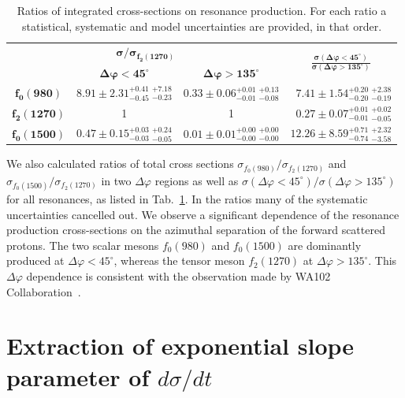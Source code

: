 {
\renewcommand{\arraystretch}{1.5}
\begin{table}[]\centering
\begin{tabular}{c|c|c|c}%
	\multicolumn{3}{c}{\;\;\;\;\;\;\;\;\;\;\;\;\;\;\;\;\;\;\;$\bm{\displaystyle\sigma/\sigma_{f_{2}(1270)}}$} & \multirow{2}{*}{$\bm{\displaystyle\frac{\sigma(\Delta\varphi<45^{\circ})}{\sigma(\Delta\varphi>135^{\circ})}}$} \\
	~ & $\bm{\Delta\varphi<45^{\circ}}$ & $\bm{\Delta\varphi>135^{\circ}}$ & \\
	\hline\hline $\bm{f_{0}(980)}$ & $8.91 \pm 2.31 ^{+0.41}_{-0.45} ~^{+7.18}_{-0.23}$ & $0.33 \pm 0.06 ^{+0.01}_{-0.01} ~^{+0.13}_{-0.08}$ & ~$7.41 \pm 1.54 ^{+0.20}_{-0.20} ~^{+2.38}_{-0.19}$\\ %
	$\bm{f_{2}(1270)}$ & 1 & 1 & ~$0.27 \pm 0.07 ^{+0.01}_{-0.01} ~^{+0.02}_{-0.05}$\\%
	$\bm{f_{0}(1500)}$ & $0.47 \pm 0.15 ^{+0.03}_{-0.03} ~^{+0.24}_{-0.05}$ & $0.01 \pm 0.01 ^{+0.00}_{-0.00} ~^{+0.00}_{-0.00}$ & $12.26 \pm 8.59 ^{+0.71}_{-0.74} ~^{+2.32}_{-3.58}$\\ %
\end{tabular}
\caption{Ratios of integrated cross-sections on resonance production. For each ratio a statistical, systematic and model uncertainties are provided, in that order.}\label{tab:resonanceRatio}
\end{table}
}
%
\indent
We also calculated ratios of total cross sections $\sigma_{f_0(980)}/\sigma_{f_2(1270)}$ and $\sigma_{f_0(1500)}/\sigma_{f_2(1270)}$ in two $\Delta \varphi$ regions as well as $\sigma(\Delta \varphi<45^{\circ})/\sigma(\Delta \varphi>135^{\circ})$ for 
all resonances, as listed in Tab.~\ref{tab:resonanceRatio}. In the ratios many of the systematic uncertainties cancelled out.
We observe a significant dependence of the resonance production cross-sections on the azimuthal separation of the forward scattered protons. The two scalar mesons $f_{0}(980)$ and $f_{0}(1500)$ are dominantly produced at $\Delta\varphi<45^{\circ}$, whereas the tensor meson $f_{2}(1270)$ at $\Delta\varphi>135^{\circ}$. This $\Delta\varphi$ dependence is consistent with the observation made by WA102 Collaboration~\cite{WA102}.






\section{Extraction of exponential slope parameter of $d\sigma/dt$}\label{sec:InvMassFit}



